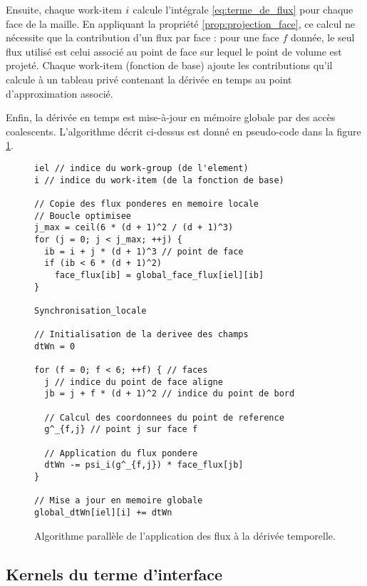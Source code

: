 Ensuite, chaque work-item $i$ calcule l’intégrale
\eqref{eq:terme_de_flux} pour chaque face de la maille.
En appliquant la propriété \ref{prop:projection_face},
ce calcul ne nécessite que la contribution d’un flux par face :
pour une face $f$ donnée, le seul flux utilisé est celui associé au point
de face sur lequel le point de volume est projeté.
Chaque work-item (fonction de base) ajoute les contributions qu’il calcule à un tableau privé
contenant la dérivée en temps au point d'approximation associé.

Enfin, la dérivée en temps est mise-à-jour en mémoire globale par des accès coalescents.
L’algorithme décrit ci-dessus est donné en pseudo-code dans la figure
\ref{img:kernel_surface_apply}.
\\

\begin{figure}[!h]
	\begin{center}
		\caption{
			\label{img:kernel_surface_apply}
			Algorithme parallèle de l'application des flux
			à la dérivée temporelle.
		}
		
		\begin{lstlisting}
iel // indice du work-group (de l'element)
i // indice du work-item (de la fonction de base)

// Copie des flux ponderes en memoire locale
// Boucle optimisee
j_max = ceil(6 * (d + 1)^2 / (d + 1)^3)
for (j = 0; j < j_max; ++j) {
  ib = i + j * (d + 1)^3 // point de face
  if (ib < 6 * (d + 1)^2)
    face_flux[ib] = global_face_flux[iel][ib]
}

Synchronisation_locale

// Initialisation de la derivee des champs
dtWn = 0

for (f = 0; f < 6; ++f) { // faces
  j // indice du point de face aligne
  jb = j + f * (d + 1)^2 // indice du point de bord

  // Calcul des coordonnees du point de reference
  g^_{f,j} // point j sur face f

  // Application du flux pondere
  dtWn -= psi_i(g^_{f,j}) * face_flux[jb]
}

// Mise a jour en memoire globale
global_dtWn[iel][i] += dtWn
		\end{lstlisting}
	\end{center}
\end{figure}




\subsection{Kernels du terme d'interface}
\label{ssect:kernel_interface}


